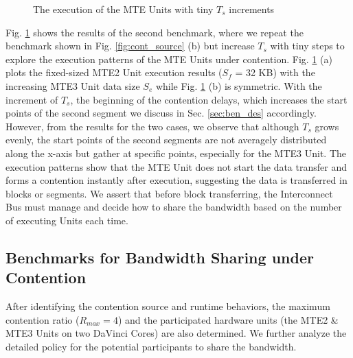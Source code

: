 \begin{figure}[tbp]
    \caption{The execution of the MTE Units with tiny $T_{s}$ increments}
    \label{fig:micro_view}
    \end{figure}

Fig. \ref{fig:micro_view} shows the results of the second benchmark, where we repeat the benchmark shown in Fig. \ref{fig:cont_source} (b) but increase $T_{s}$ with tiny steps to explore the execution patterns of the MTE Units under contention. Fig. \ref{fig:micro_view} (a) plots the fixed-sized MTE2 Unit execution results ($S_f$ = 32 KB) with the increasing MTE3 Unit data size $S_e$ while Fig. \ref{fig:micro_view} (b) is symmetric. With the increment of $T_{s}$, the beginning of the contention delays, which increases the start points of the second segment we discuss in Sec. \ref{sec:ben_des} accordingly. However, from the results for the two cases, we observe that although $T_{s}$ grows evenly, the start points of the second segments are not averagely distributed along the x-axis but gather at specific points, especially for the MTE3 Unit. The execution patterns show that the MTE Unit does not start the data transfer and forms a contention instantly after execution, suggesting the data is transferred in blocks or segments. We assert that before block transferring, the Interconnect Bus must manage and decide how to share the bandwidth based on the number of executing Units each time.

\subsection{Benchmarks for Bandwidth Sharing under Contention}

After identifying the contention source and runtime behaviors, the maximum contention ratio ($R_{max} = 4$) and the participated hardware units (the MTE2 \& MTE3 Units on two DaVinci Cores) are also determined. We further analyze the detailed policy for the potential participants to share the bandwidth. 

